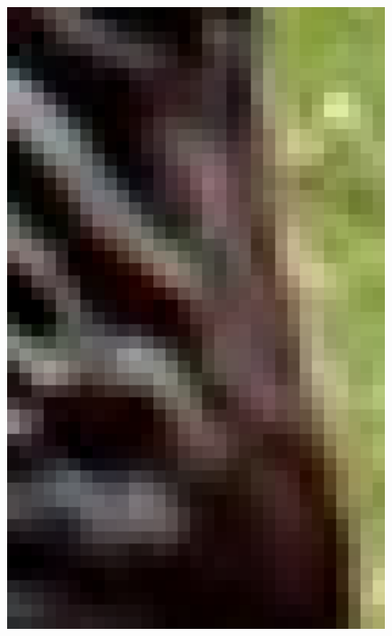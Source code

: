 \documentclass[review,numbers,sort&compress]{elsarticle}  %
\begin{document}
\begin{figure}[t]
{\begin{minipage}[b]{0.12\textwidth}
                \includegraphics[width=1\textwidth]{compareImage/PLHT_zebra_mag_2.png}
            \end{minipage}
        }
\end{figure}
\end{document}
